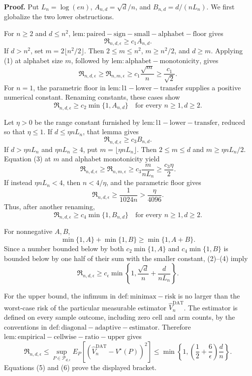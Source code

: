 \textbf{Proof.}
Put \(L_n=\log(en)\), \(A_{n,d}=\sqrt d/n\), and
\(B_{n,d}=d/(nL_n)\).  We first globalize the two lower obstructions.

For \(n\geq2\) and \(d\leq n^2\),
\(\mathrm{lem:paired-sign-small-alphabet-floor}\) gives
\[
 \mathfrak R_{n,d,\epsilon}\geq c_1A_{n,d}.
 \tag{1}
\]
If \(d>n^2\), set \(m=2\lfloor n^2/2\rfloor\).  Then
\(2\leq m\leq n^2\), \(m\geq n^2/2\), and \(d\geq m\).  Applying (1) at alphabet size \(m\), followed by
\(\mathrm{lem:alphabet-monotonicity}\), gives
\[
 \mathfrak R_{n,d,\epsilon}
 \geq\mathfrak R_{n,m,\epsilon}
 \geq c_1\frac{\sqrt m}{n}
 \geq\frac{c_1}{\sqrt2}.
\]
For \(n=1\), the parametric floor in
\(\mathrm{lem:l1-lower-transfer}\) supplies a positive numerical constant.  Renaming constants, these cases show
\[
 \mathfrak R_{n,d,\epsilon}
 \geq c_2\min\{1,A_{n,d}\}
 \quad\text{for every }n\geq1, d\geq2.
 \tag{2}
\]

Let \(\eta>0\) be the range constant furnished by
\(\mathrm{lem:l1-lower-transfer}\), reduced so that \(\eta\leq1\).  If
\(d\leq\eta nL_n\), that lemma gives
\[
 \mathfrak R_{n,d,\epsilon}\geq c_3B_{n,d}.
 \tag{3}
\]
If \(d>\eta nL_n\) and \(\eta nL_n\geq4\), put
\(m=\lfloor\eta nL_n\rfloor\).  Then
\(2\leq m\leq d\) and \(m\geq\eta nL_n/2\).  Equation (3) at \(m\) and alphabet monotonicity yield
\[
 \mathfrak R_{n,d,\epsilon}
 \geq\mathfrak R_{n,m,\epsilon}
 \geq c_3\frac{m}{nL_n}
 \geq\frac{c_3\eta}{2}.
\]
If instead \(\eta nL_n<4\), then \(n<4/\eta\), and the parametric floor gives
\[
 \mathfrak R_{n,d,\epsilon}\geq\frac1{1024n}
 >\frac{\eta}{4096}.
\]
Thus, after another renaming,
\[
 \mathfrak R_{n,d,\epsilon}
 \geq c_4\min\{1,B_{n,d}\}
 \quad\text{for every }n\geq1, d\geq2.
 \tag{4}
\]

For nonnegative \(A,B\),
\[
 \min\{1,A\}+\min\{1,B\}\geq\min\{1,A+B\}.
\]
Since a number bounded below by both \(c_2\min\{1,A\}\) and
\(c_4\min\{1,B\}\) is bounded below by one half of their sum with the smaller constant, (2)--(4) imply
\[
 \mathfrak R_{n,d,\epsilon}
 \geq c_\epsilon\min\!\left\{1,
       \frac{\sqrt d}{n}+\frac d{nL_n}
      \right\}.
 \tag{5}
\]

For the upper bound, the infimum in \(\mathrm{def:minimax-risk}\) is no larger than the worst-case risk of the particular measurable estimator
\(\widehat V_n^{\mathrm{DAT}}\).  The estimator is defined on every sample outcome, including zero cell and arm counts, by the conventions in
\(\mathrm{def:diagonal-adaptive-estimator}\).  Therefore
\(\mathrm{lem:empirical-cellwise-ratio-upper}\) gives
\[
 \mathfrak R_{n,d,\epsilon}
 \leq\sup_{P\in\mathcal P_{d,\epsilon}}
 E_P[(\widehat V_n^{\mathrm{DAT}}-V^\star(P))^2]
 \leq\min\!\left\{1,
  \left(\frac12+\frac6\epsilon\right)\frac dn
 \right\}.
 \tag{6}
\]
Equations (5) and (6) prove the displayed bracket.

